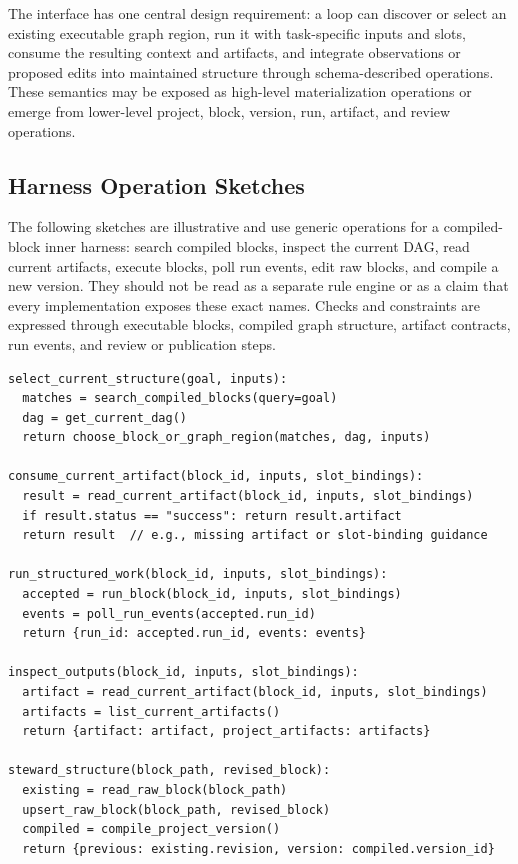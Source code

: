 \documentclass{article}
\begin{document}
The interface has one central design requirement: a loop can discover or select an existing executable graph region, run it with task-specific inputs and slots, consume the resulting context and artifacts, and integrate observations or proposed edits into maintained structure through schema-described operations. These semantics may be exposed as high-level materialization operations or emerge from lower-level project, block, version, run, artifact, and review operations.

\subsection{Harness Operation Sketches}

The following sketches are illustrative and use generic operations for a compiled-block inner harness: search compiled blocks, inspect the current DAG, read current artifacts, execute blocks, poll run events, edit raw blocks, and compile a new version. They should not be read as a separate rule engine or as a claim that every implementation exposes these exact names. Checks and constraints are expressed through executable blocks, compiled graph structure, artifact contracts, run events, and review or publication steps.

\begin{verbatim}
select_current_structure(goal, inputs):
  matches = search_compiled_blocks(query=goal)
  dag = get_current_dag()
  return choose_block_or_graph_region(matches, dag, inputs)

consume_current_artifact(block_id, inputs, slot_bindings):
  result = read_current_artifact(block_id, inputs, slot_bindings)
  if result.status == "success": return result.artifact
  return result  // e.g., missing artifact or slot-binding guidance

run_structured_work(block_id, inputs, slot_bindings):
  accepted = run_block(block_id, inputs, slot_bindings)
  events = poll_run_events(accepted.run_id)
  return {run_id: accepted.run_id, events: events}

inspect_outputs(block_id, inputs, slot_bindings):
  artifact = read_current_artifact(block_id, inputs, slot_bindings)
  artifacts = list_current_artifacts()
  return {artifact: artifact, project_artifacts: artifacts}

steward_structure(block_path, revised_block):
  existing = read_raw_block(block_path)
  upsert_raw_block(block_path, revised_block)
  compiled = compile_project_version()
  return {previous: existing.revision, version: compiled.version_id}
\end{verbatim}
\end{document}
